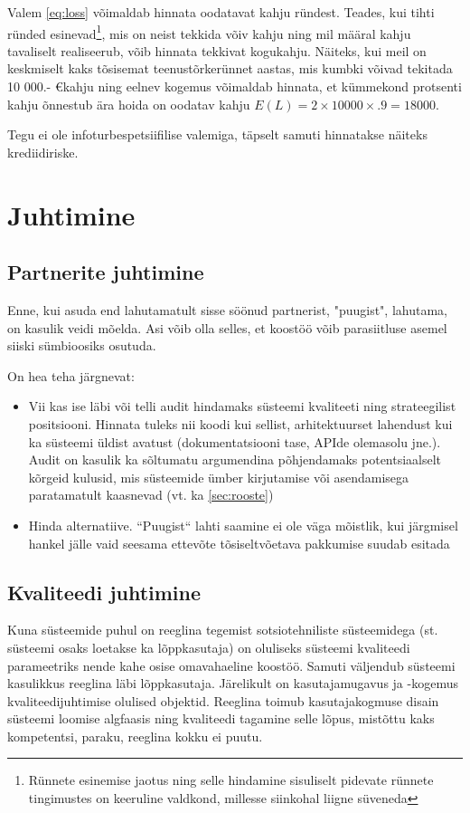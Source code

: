 \documentclass{tufte-book}
\begin{document}
Valem \ref{eq:loss} võimaldab hinnata oodatavat kahju ründest. Teades, kui tihti ründed esinevad\footnote{Rünnete esinemise jaotus ning selle hindamine sisuliselt pidevate rünnete tingimustes on keeruline valdkond, millesse siinkohal liigne süveneda}, mis on neist tekkida võiv kahju ning mil määral kahju tavaliselt realiseerub, võib hinnata tekkivat kogukahju. Näiteks, kui meil on keskmiselt kaks tõsisemat teenustõrkerünnet aastas, mis kumbki võivad tekitada 10 000.- \euro kahju ning eelnev kogemus võimaldab hinnata, et kümmekond protsenti kahju õnnestub ära hoida on oodatav kahju $E(L)=2 \times 10000 \times .9 = 18 000$. 

Tegu ei ole infoturbespetsiifilise valemiga, täpselt samuti hinnatakse näiteks krediidiriske.

\chapter{Juhtimine}
\section{Partnerite juhtimine}
Enne, kui asuda end lahutamatult sisse söönud partnerist, "puugist", lahutama, on kasulik veidi mõelda. Asi võib olla selles, et koostöö võib parasiitluse asemel siiski sümbioosiks osutuda. 

On hea teha järgnevat:
\begin{itemize}
	\item Vii kas ise läbi või telli audit hindamaks süsteemi kvaliteeti ning strateegilist positsiooni. Hinnata tuleks nii koodi kui sellist, arhitektuurset lahendust kui ka süsteemi üldist avatust (dokumentatsiooni tase, APIde olemasolu jne.). Audit on kasulik ka sõltumatu argumendina põhjendamaks potentsiaalselt kõrgeid kulusid, mis süsteemide ümber kirjutamise või asendamisega paratamatult kaasnevad (vt. ka \ref{sec:rooste})
	\item Hinda alternatiive. ``Puugist`` lahti saamine ei ole väga mõistlik, kui järgmisel hankel jälle vaid seesama ettevõte tõsiseltvõetava pakkumise suudab esitada  
\end{itemize}

\section{Kvaliteedi juhtimine}
Kuna süsteemide puhul on reeglina tegemist sotsiotehniliste süsteemidega (st. süsteemi osaks loetakse ka lõppkasutaja) on oluliseks süsteemi kvaliteedi parameetriks nende kahe osise omavahaeline koostöö. Samuti väljendub süsteemi kasulikkus reeglina läbi lõppkasutaja. Järelikult on kasutajamugavus ja -kogemus kvaliteedijuhtimise olulised objektid. Reeglina toimub kasutajakogmuse disain süsteemi loomise algfaasis ning kvaliteedi tagamine selle lõpus, mistõttu kaks kompetentsi, paraku, reeglina kokku ei puutu.  
\end{document}
